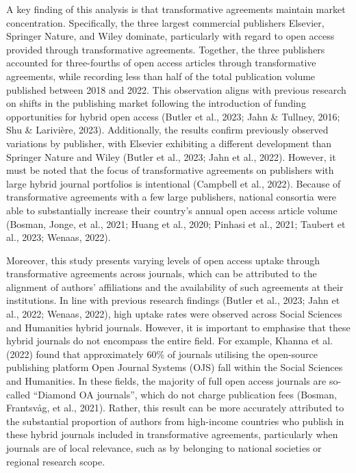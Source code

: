 \documentclass[a4paper,man,floatsintext,longtable,noextraspace,12pt]{apa6}
\begin{document}
A key finding of this analysis is that transformative agreements
maintain market concentration. Specifically, the three largest
commercial publishers Elsevier, Springer Nature, and Wiley dominate,
particularly with regard to open access provided through transformative
agreements. Together, the three publishers accounted for three-fourths
of open access articles through transformative agreements, while
recording less than half of the total publication volume published
between 2018 and 2022. This observation aligns with previous research on
shifts in the publishing market following the introduction of funding
opportunities for hybrid open access (Butler et al., 2023; Jahn \&
Tullney, 2016; Shu \& Larivière, 2023). Additionally, the results
confirm previously observed variations by publisher, with Elsevier
exhibiting a different development than Springer Nature and Wiley
(Butler et al., 2023; Jahn et al., 2022). However, it must be noted that
the focus of transformative agreements on publishers with large hybrid
journal portfolios is intentional (Campbell et al., 2022). Because of
transformative agreements with a few large publishers, national
consortia were able to substantially increase their country's annual
open access article volume (Bosman, Jonge, et al., 2021; Huang et al.,
2020; Pinhasi et al., 2021; Taubert et al., 2023; Wenaas, 2022).

Moreover, this study presents varying levels of open access uptake
through transformative agreements across journals, which can be
attributed to the alignment of authors' affiliations and the
availability of such agreements at their institutions. In line with
previous research findings (Butler et al., 2023; Jahn et al., 2022;
Wenaas, 2022), high uptake rates were observed across Social Sciences
and Humanities hybrid journals. However, it is important to emphasise
that these hybrid journals do not encompass the entire field. For
example, Khanna et al. (2022) found that approximately 60\% of journals
utilising the open-source publishing platform Open Journal Systems (OJS)
fall within the Social Sciences and Humanities. In these fields, the
majority of full open access journals are so-called ``Diamond OA
journals'', which do not charge publication fees (Bosman, Frantsvåg, et
al., 2021). Rather, this result can be more accurately attributed to the
substantial proportion of authors from high-income countries who publish
in these hybrid journals included in transformative agreements,
particularly when journals are of local relevance, such as by belonging
to national societies or regional research scope.
\end{document}
